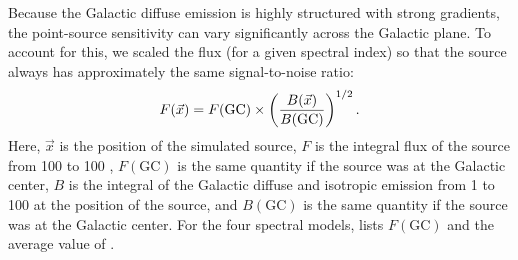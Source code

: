 Because the Galactic diffuse emission is highly structured with
strong gradients, the point-source
sensitivity can vary significantly across the Galactic plane.
To account for this, we scaled the flux (for a given spectral index)
so that the source always has approximately the same signal-to-noise ratio:
\begin{equation}
  \eqnlabel{scale_flux_by_background}
  F(\vec{x}) = F(\text{GC}) \times \left(
  \frac{B(\vec{x})}{B(\text{GC})}\right)^{1/2}.
\end{equation}
Here, $\vec{x}$ is the position of the simulated source, $F$ is the integral
flux of the source from 100 \mev to 100 \gev, $F(\text{GC})$
is the same quantity if the source was at the Galactic center, $B$
is the integral of the Galactic diffuse and isotropic emission
from 1 \gev to 100 \gev at the position of the source, and $B(\text{GC})$ is the same quantity
if the source was at the Galactic center.  For the four spectral models,
 lists $F(\text{GC})$ and the average value of \ts.

